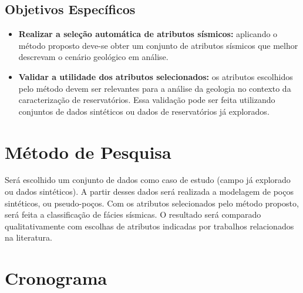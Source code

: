 \documentclass{ufsc-thesis}
\begin{document}
\section{Objetivos Específicos}
\begin{itemize}
    \item \textbf{Realizar a seleção automática de atributos sísmicos:} aplicando o método proposto deve-se obter um conjunto de atributos sísmicos que melhor descrevam o cenário geológico em análise.
    
    \item \textbf{Validar a utilidade dos atributos selecionados:} os atributos escolhidos pelo método devem ser relevantes para a análise da geologia no contexto da caracterização de reservatórios. Essa validação pode ser feita utilizando conjuntos de dados sintéticos ou dados de reservatórios já explorados.
\end{itemize}

\chapter{Método de Pesquisa}
Será escolhido um conjunto de dados como caso de estudo (campo já explorado ou dados sintéticos). A partir desses dados será realizada a modelagem de poços sintéticos, ou pseudo-poços. Com os atributos selecionados pelo método proposto, será feita a classificação de fácies sísmicas. O resultado será comparado qualitativamente com escolhas de atributos indicadas por trabalhos relacionados na literatura.

\chapter{Cronograma}
\end{document}
